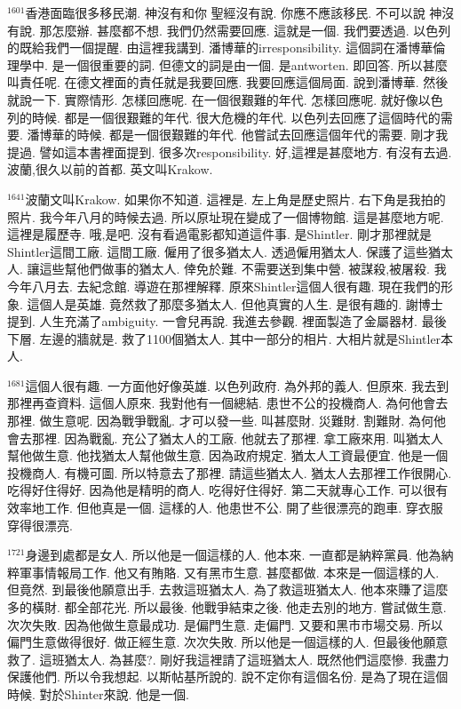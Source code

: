 \documentclass{book}
\begin{document}
$^{1601}$香港面臨很多移民潮.
神沒有和你 聖經沒有說.
你應不應該移民.
不可以說 神沒有說.
那怎麼辦.
甚麼都不想.
我們仍然需要回應.
這就是一個.
我們要透過.
以色列的既給我們一個提醒.
由這裡我講到.
潘博華的irresponsibility.
這個詞在潘博華倫理學中.
是一個很重要的詞.
但德文的詞是由一個.
是antworten.
即回答.
所以甚麼叫責任呢.
在德文裡面的責任就是我要回應.
我要回應這個局面.
說到潘博華.
然後就說一下.
實際情形.
怎樣回應呢.
在一個很艱難的年代.
怎樣回應呢.
就好像以色列的時候.
都是一個很艱難的年代.
很大危機的年代.
以色列去回應了這個時代的需要.
潘博華的時候.
都是一個很艱難的年代.
他嘗試去回應這個年代的需要.
剛才我提過.
譬如這本書裡面提到.
很多次responsibility.
好,這裡是甚麼地方.
有沒有去過.
波蘭,很久以前的首都.
英文叫Krakow.

$^{1641}$波蘭文叫Krakow.
如果你不知道.
這裡是.
左上角是歷史照片.
右下角是我拍的照片.
我今年八月的時候去過.
所以原址現在變成了一個博物館.
這是甚麼地方呢.
這裡是履歷寺.
哦,是吧.
沒有看過電影都知道這件事.
是Shintler.
剛才那裡就是Shintler這間工廠.
這間工廠.
僱用了很多猶太人.
透過僱用猶太人.
保護了這些猶太人.
讓這些幫他們做事的猶太人.
倖免於難.
不需要送到集中營.
被謀殺,被屠殺.
我今年八月去.
去紀念館.
導遊在那裡解釋.
原來Shintler這個人很有趣.
現在我們的形象.
這個人是英雄.
竟然救了那麼多猶太人.
但他真實的人生.
是很有趣的.
謝博士提到.
人生充滿了ambiguity.
一會兒再說.
我進去參觀.
裡面製造了金屬器材.
最後下層.
左邊的牆就是.
救了1100個猶太人.
其中一部分的相片.
大相片就是Shintler本人.

$^{1681}$這個人很有趣.
一方面他好像英雄.
以色列政府.
為外邦的義人.
但原來.
我去到那裡再查資料.
這個人原來.
我對他有一個總結.
患世不公的投機商人.
為何他會去那裡.
做生意呢.
因為戰爭戰亂.
才可以發一些.
叫甚麼財.
災難財.
割難財.
為何他會去那裡.
因為戰亂.
充公了猶太人的工廠.
他就去了那裡.
拿工廠來用.
叫猶太人幫他做生意.
他找猶太人幫他做生意.
因為政府規定.
猶太人工資最便宜.
他是一個投機商人.
有機可圖.
所以特意去了那裡.
請這些猶太人.
猶太人去那裡工作很開心.
吃得好住得好.
因為他是精明的商人.
吃得好住得好.
第二天就專心工作.
可以很有效率地工作.
但他真是一個.
這樣的人.
他患世不公.
開了些很漂亮的跑車.
穿衣服穿得很漂亮.

$^{1721}$身邊到處都是女人.
所以他是一個這樣的人.
他本來.
一直都是納粹黨員.
他為納粹軍事情報局工作.
他又有賄賂.
又有黑市生意.
甚麼都做.
本來是一個這樣的人.
但竟然.
到最後他願意出手.
去救這班猶太人.
為了救這班猶太人.
他本來賺了這麼多的橫財.
都全部花光.
所以最後.
他戰爭結束之後.
他走去別的地方.
嘗試做生意.
次次失敗.
因為他做生意最成功.
是偏門生意.
走偏門.
又要和黑市市場交易.
所以偏門生意做得很好.
做正經生意.
次次失敗.
所以他是一個這樣的人.
但最後他願意救了.
這班猶太人.
為甚麼?.
剛好我這裡請了這班猶太人.
既然他們這麼慘.
我盡力保護他們.
所以令我想起.
以斯帖基所說的.
說不定你有這個名份.
是為了現在這個時候.
對於Shinter來說.
他是一個.
\end{document}

